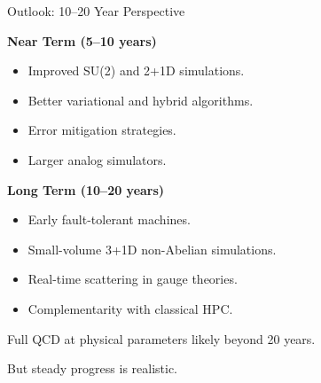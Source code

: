 \documentclass[11pt]{beamer}
\begin{document}
\begin{frame}{Outlook: 10–20 Year Perspective}

\textbf{Near Term (5–10 years)}
\begin{itemize}
\item Improved SU(2) and 2+1D simulations.
\item Better variational and hybrid algorithms.
\item Error mitigation strategies.
\item Larger analog simulators.
\end{itemize}

\bigskip

\textbf{Long Term (10–20 years)}
\begin{itemize}
\item Early fault-tolerant machines.
\item Small-volume 3+1D non-Abelian simulations.
\item Real-time scattering in gauge theories.
\item Complementarity with classical HPC.
\end{itemize}

\bigskip

Full QCD at physical parameters likely beyond 20 years.

But steady progress is realistic.
\end{frame}
\end{document}
